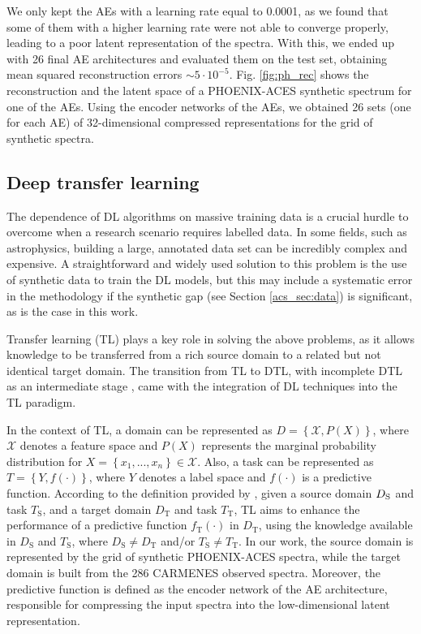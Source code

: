 We only kept the AEs with a learning rate equal to 0.0001, as we found that some of them with a higher learning rate were not able to converge properly, leading to a poor latent representation of the spectra. With this, we ended up with 26 final AE architectures and evaluated them on the test set, obtaining mean squared reconstruction errors $\sim 5\cdot10^{-5}$. Fig. \ref{fig:ph_rec} shows the reconstruction and the latent space of a PHOENIX-ACES synthetic spectrum for one of the AEs. Using the encoder networks of the AEs, we obtained 26 sets (one for each AE) of 32-dimensional compressed representations for the grid of synthetic spectra.


\subsection{Deep transfer learning} \label{acs_sec:dtl}

The dependence of DL algorithms on massive training data is a crucial hurdle to overcome when a research scenario requires labelled data. In some fields, such as astrophysics, building a large, annotated data set can be incredibly complex and expensive. A straightforward and widely used solution to this problem is the use of synthetic data to train the DL models, but this may include a systematic error in the methodology if the synthetic gap (see Section \ref{acs_sec:data}) is significant, as is the case in this work.

Transfer learning (TL) plays a key role in solving the above problems, as it allows knowledge to be transferred from a rich source domain to a related but not identical target domain. The transition from TL to DTL, with incomplete DTL as an intermediate stage \citep[deep neural networks are only used as feature extractors in TL models;][]{yu2022}, came with the integration of DL techniques into the TL paradigm.

In the context of TL, a domain can be represented as $D=\left \{\mathcal{X},P(X)  \right \}$, where $\mathcal{X}$ denotes a feature space and $P(X)$ represents the marginal probability distribution for $X=\left \{x_1,...,x_n \right \} \in \mathcal{X}$. Also,  a task can be represented as $T=\left \{Y, f(\cdot) \right \}$, where $Y$ denotes a label space and $f(\cdot)$ is a predictive function. According to the definition provided by \citet{pan2010}, given a source domain $D_{\rm S}$ and task $T_{\mathrm{S}}$, and a target domain $D_{\mathrm{T}}$ and task $T_{\mathrm{T}}$, TL aims to enhance the performance of a predictive function $f_{\mathrm{T}}(\cdot)$ in $D_{\mathrm{T}}$, using the knowledge available in $D_{\mathrm{S}}$ and $T_{\mathrm{S}}$, where $D_{\mathrm{S}}\neq D_{\mathrm{T}}$ and/or $T_{\mathrm{S}}\neq T_{\mathrm{T}}$. In our work, the source domain is represented by the grid of synthetic PHOENIX-ACES spectra, while the target domain is built from the 286 CARMENES observed spectra. Moreover, the predictive function is defined as the encoder network of the AE architecture, responsible for compressing the input spectra into the low-dimensional latent representation.

